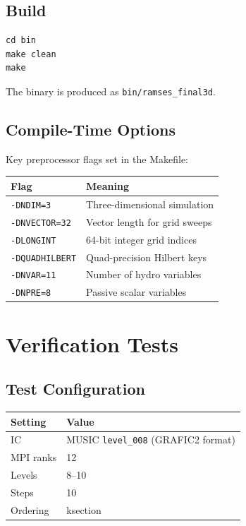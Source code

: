\documentclass[11pt,fleqn]{book}
\begin{document}
\section{Build}

\begin{codebox}
\begin{lstlisting}[style=bash,numbers=none]
cd bin
make clean
make
\end{lstlisting}
\end{codebox}

The binary is produced as \texttt{bin/ramses\_final3d}.

\section{Compile-Time Options}

Key preprocessor flags set in the Makefile:
\begin{center}
\begin{tabular}{ll}
\toprule
\textbf{Flag} & \textbf{Meaning} \\
\midrule
\texttt{-DNDIM=3} & Three-dimensional simulation \\
\texttt{-DNVECTOR=32} & Vector length for grid sweeps \\
\texttt{-DLONGINT} & 64-bit integer grid indices \\
\texttt{-DQUADHILBERT} & Quad-precision Hilbert keys \\
\texttt{-DNVAR=11} & Number of hydro variables \\
\texttt{-DNPRE=8} & Passive scalar variables \\
\bottomrule
\end{tabular}
\end{center}


\chapter{Verification Tests}

\section{Test Configuration}

\begin{center}
\begin{tabular}{ll}
\toprule
\textbf{Setting} & \textbf{Value} \\
\midrule
IC & MUSIC \texttt{level\_008} (GRAFIC2 format) \\
MPI ranks & 12 \\
Levels & 8--10 \\
Steps & 10 \\
Ordering & ksection \\
\bottomrule
\end{tabular}
\end{center}
\end{document}
